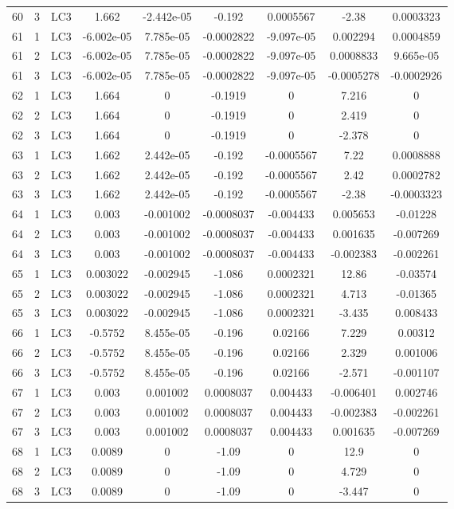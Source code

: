\documentclass{article}%
\begin{document}
\begin{longtable}{| c c c | c c c c c c |}
60&3&LC3&1.662&{-}2.442e{-}05&{-}0.192&0.0005567&{-}2.38&0.0003323\\%
61&1&LC3&{-}6.002e{-}05&7.785e{-}05&{-}0.0002822&{-}9.097e{-}05&0.002294&0.0004859\\%
61&2&LC3&{-}6.002e{-}05&7.785e{-}05&{-}0.0002822&{-}9.097e{-}05&0.0008833&9.665e{-}05\\%
61&3&LC3&{-}6.002e{-}05&7.785e{-}05&{-}0.0002822&{-}9.097e{-}05&{-}0.0005278&{-}0.0002926\\%
62&1&LC3&1.664&0&{-}0.1919&0&7.216&0\\%
62&2&LC3&1.664&0&{-}0.1919&0&2.419&0\\%
62&3&LC3&1.664&0&{-}0.1919&0&{-}2.378&0\\%
63&1&LC3&1.662&2.442e{-}05&{-}0.192&{-}0.0005567&7.22&0.0008888\\%
63&2&LC3&1.662&2.442e{-}05&{-}0.192&{-}0.0005567&2.42&0.0002782\\%
63&3&LC3&1.662&2.442e{-}05&{-}0.192&{-}0.0005567&{-}2.38&{-}0.0003323\\%
64&1&LC3&0.003&{-}0.001002&{-}0.0008037&{-}0.004433&0.005653&{-}0.01228\\%
64&2&LC3&0.003&{-}0.001002&{-}0.0008037&{-}0.004433&0.001635&{-}0.007269\\%
64&3&LC3&0.003&{-}0.001002&{-}0.0008037&{-}0.004433&{-}0.002383&{-}0.002261\\%
65&1&LC3&0.003022&{-}0.002945&{-}1.086&0.0002321&12.86&{-}0.03574\\%
65&2&LC3&0.003022&{-}0.002945&{-}1.086&0.0002321&4.713&{-}0.01365\\%
65&3&LC3&0.003022&{-}0.002945&{-}1.086&0.0002321&{-}3.435&0.008433\\%
66&1&LC3&{-}0.5752&8.455e{-}05&{-}0.196&0.02166&7.229&0.00312\\%
66&2&LC3&{-}0.5752&8.455e{-}05&{-}0.196&0.02166&2.329&0.001006\\%
66&3&LC3&{-}0.5752&8.455e{-}05&{-}0.196&0.02166&{-}2.571&{-}0.001107\\%
67&1&LC3&0.003&0.001002&0.0008037&0.004433&{-}0.006401&0.002746\\%
67&2&LC3&0.003&0.001002&0.0008037&0.004433&{-}0.002383&{-}0.002261\\%
67&3&LC3&0.003&0.001002&0.0008037&0.004433&0.001635&{-}0.007269\\%
68&1&LC3&0.0089&0&{-}1.09&0&12.9&0\\%
68&2&LC3&0.0089&0&{-}1.09&0&4.729&0\\%
68&3&LC3&0.0089&0&{-}1.09&0&{-}3.447&0\\%

\end{longtable}
\end{document}
